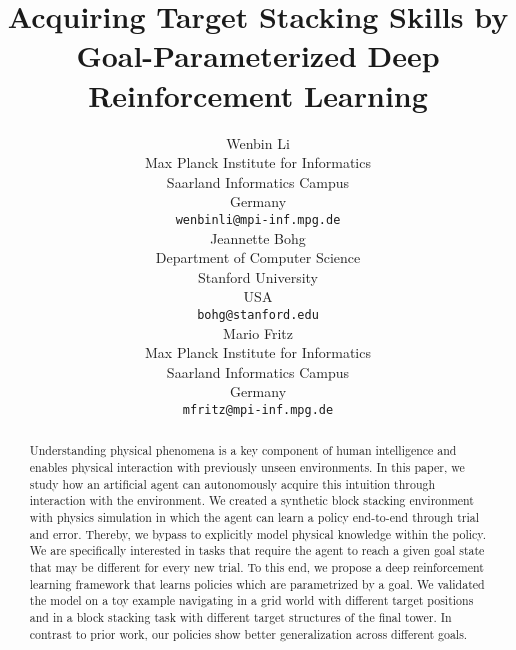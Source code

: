 \documentclass{article} %
\title{Acquiring Target Stacking Skills by Goal-Parameterized Deep Reinforcement Learning}
\author{Wenbin Li \\
Max Planck Institute for Informatics\\
Saarland Informatics Campus\\
Germany \\
\texttt{wenbinli@mpi-inf.mpg.de} \\
\And
Jeannette Bohg \\
Department of Computer Science \\
Stanford University \\
USA \\
\texttt{bohg@stanford.edu} \\
\AND
Mario Fritz \\
Max Planck Institute for Informatics \\
Saarland Informatics Campus\\
Germany \\
\texttt{mfritz@mpi-inf.mpg.de} \\
}
\begin{document}
\maketitle

\begin{abstract}
Understanding physical phenomena is a key component of human intelligence and enables physical interaction with previously unseen environments. In this paper, we study how an artificial agent can autonomously acquire this intuition through interaction with the environment. We created a synthetic block stacking environment with physics simulation in which the agent can learn a policy end-to-end through trial and error. Thereby, we bypass to explicitly model physical knowledge within the policy. We are specifically interested in tasks that require the agent to reach a given goal state that may be different for every new trial. To this end, we propose a deep reinforcement learning framework that learns policies which are parametrized by a goal. We validated the model on a toy example navigating in a grid world with different target positions and in a block stacking task with different target structures of the final tower. In contrast to prior work, our policies show better generalization across different goals.
\end{abstract}







%



\end{document}
